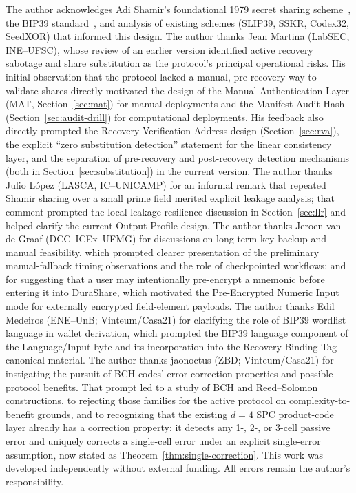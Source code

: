 \documentclass[11pt]{article}
\begin{document}
The author acknowledges Adi Shamir's foundational 1979 secret sharing scheme~\cite{shamir1979}, the BIP39 standard~\cite{bip39}, and analysis of existing schemes (SLIP39, SSKR, Codex32, SeedXOR) that informed this design. The author thanks Jean Martina (LabSEC, INE--UFSC), whose review of an earlier version identified active recovery sabotage and share substitution as the protocol's principal operational risks. His initial observation that the protocol lacked a manual, pre-recovery way to validate shares directly motivated the design of the Manual Authentication Layer (MAT, Section~\ref{sec:mat}) for manual deployments and the Manifest Audit Hash (Section~\ref{sec:audit-drill}) for computational deployments. His feedback also directly prompted the Recovery Verification Address design (Section~\ref{sec:rva}), the explicit ``zero substitution detection'' statement for the linear consistency layer, and the separation of pre-recovery and post-recovery detection mechanisms (both in Section~\ref{sec:substitution}) in the current version. The author thanks Julio L\'opez (LASCA, IC--UNICAMP) for an informal remark that repeated Shamir sharing over a small prime field merited explicit leakage analysis; that comment prompted the local-leakage-resilience discussion in Section~\ref{sec:llr} and helped clarify the current Output Profile design. The author thanks Jeroen van de Graaf (DCC--ICEx--UFMG) for discussions on long-term key backup and manual feasibility, which prompted clearer presentation of the preliminary manual-fallback timing observations and the role of checkpointed workflows; and for suggesting that a user may intentionally pre-encrypt a mnemonic before entering it into DuraShare, which motivated the Pre-Encrypted Numeric Input mode for externally encrypted field-element payloads. The author thanks Edil Medeiros (ENE--UnB; Vinteum/Casa21) for clarifying the role of BIP39 wordlist language in wallet derivation, which prompted the BIP39 language component of the Language/Input byte and its incorporation into the Recovery Binding Tag canonical material. The author thanks jaonoctus (ZBD; Vinteum/Casa21) for instigating the pursuit of BCH codes' error-correction properties and possible protocol benefits. That prompt led to a study of BCH and Reed--Solomon constructions, to rejecting those families for the active protocol on complexity-to-benefit grounds, and to recognizing that the existing $d=4$ SPC product-code layer already has a correction property: it detects any 1-, 2-, or 3-cell passive error and uniquely corrects a single-cell error under an explicit single-error assumption, now stated as Theorem~\ref{thm:single-correction}. This work was developed independently without external funding. All errors remain the author's responsibility.
\end{document}
